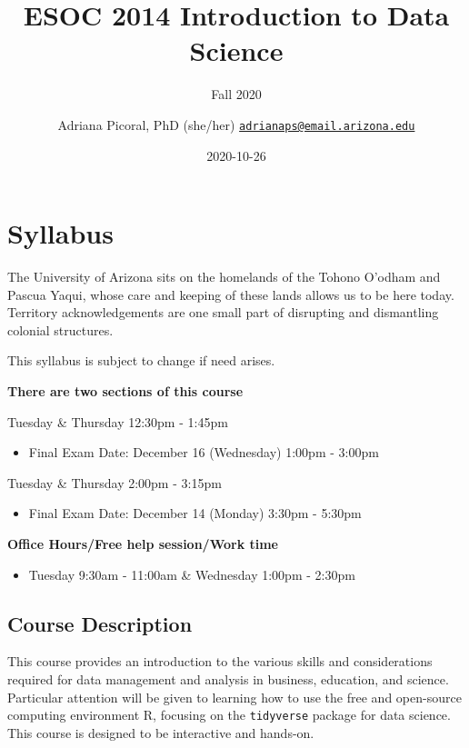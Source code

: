 \documentclass[
]{book}
\title{ESOC 2014 Introduction to Data Science}
\subtitle{Fall 2020}
\author{Adriana Picoral, PhD (she/her) \href{mailto:adrianaps@email.arizona.edu}{\nolinkurl{adrianaps@email.arizona.edu}}}
\date{2020-10-26}
\providecommand{\tightlist}{%
  \setlength{\itemsep}{0pt}\setlength{\parskip}{0pt}}
\begin{document}
\maketitle

{
\setcounter{tocdepth}{1}
\tableofcontents
}
\hypertarget{syllabus}{%
\chapter{Syllabus}\label{syllabus}}

The University of Arizona sits on the homelands of the Tohono O'odham and Pascua Yaqui, whose care and keeping of these lands allows us to be here today. Territory acknowledgements are one small part of disrupting and dismantling colonial structures.

This syllabus is subject to change if need arises.

\textbf{There are two sections of this course}

Tuesday \& Thursday 12:30pm - 1:45pm

\begin{itemize}
\tightlist
\item
  Final Exam Date: December 16 (Wednesday) 1:00pm - 3:00pm
\end{itemize}

Tuesday \& Thursday 2:00pm - 3:15pm

\begin{itemize}
\tightlist
\item
  Final Exam Date: December 14 (Monday) 3:30pm - 5:30pm
\end{itemize}

\textbf{Office Hours/Free help session/Work time}

\begin{itemize}
\tightlist
\item
  Tuesday 9:30am - 11:00am \& Wednesday 1:00pm - 2:30pm
\end{itemize}

\hypertarget{course-description}{%
\section{Course Description}\label{course-description}}

This course provides an introduction to the various skills and considerations required for data management and analysis in business, education, and science. Particular attention will be given to learning how to use the free and open-source computing environment R, focusing on the \texttt{tidyverse} package for data science. This course is designed to be interactive and hands-on.
\end{document}
